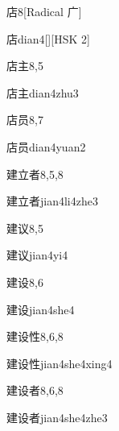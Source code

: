 \begin{entry}{店}{8}[Radical 广]
  \begin{phonetics}{店}{dian4}[][HSK 2]
  \end{phonetics}
\end{entry}

\begin{entry}{店主}{8,5}
  \begin{phonetics}{店主}{dian4zhu3}
  \end{phonetics}
\end{entry}

\begin{entry}{店员}{8,7}
  \begin{phonetics}{店员}{dian4yuan2}
  \end{phonetics}
\end{entry}

\begin{entry}{建立者}{8,5,8}
  \begin{phonetics}{建立者}{jian4li4zhe3}
  \end{phonetics}
\end{entry}

\begin{entry}{建议}{8,5}
  \begin{phonetics}{建议}{jian4yi4}
  \end{phonetics}
\end{entry}

\begin{entry}{建设}{8,6}
  \begin{phonetics}{建设}{jian4she4}
  \end{phonetics}
\end{entry}

\begin{entry}{建设性}{8,6,8}
  \begin{phonetics}{建设性}{jian4she4xing4}
  \end{phonetics}
\end{entry}

\begin{entry}{建设者}{8,6,8}
  \begin{phonetics}{建设者}{jian4she4zhe3}
  \end{phonetics}
\end{entry}

